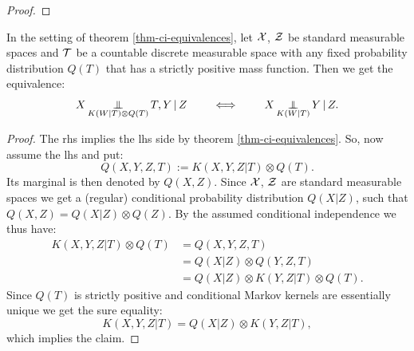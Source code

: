 \begin{Thm}
\begin{proof}

\end{proof}
\end{Thm}


\begin{Rem}
    In the setting of theorem \ref{thm-ci-equivalences},
    let  $\mathcal{X}$, $\mathcal{Z}$ be standard measurable spaces and $\mathcal{T}$ be a countable discrete measurable space with any fixed probability distribution $Q(T)$ that has a strictly positive mass function.
    Then we get the equivalence:
    \[X \operatorname*{\perp\mkern-11mu\perp}_{K(W|T)\otimes Q(T)} T,Y \operatorname*{|} Z  \qquad \iff \qquad  X \operatorname*{\perp\mkern-11mu\perp}_{K(W|T)} Y \operatorname*{|} Z.\]
    \begin{proof}
        The rhs implies the lhs side by theorem \ref{thm-ci-equivalences}. 
        So, now assume the lhs and put:
        \[ Q(X,Y,Z,T) := K(X,Y,Z|T) \otimes Q(T).  \]
        Its marginal is then denoted by $Q(X,Z)$.
        Since $\mathcal{X}$, $\mathcal{Z}$ are standard measurable spaces we get a (regular) conditional probability distribution $Q(X|Z)$, such that $Q(X,Z) = Q(X|Z)\otimes Q(Z)$. By the assumed conditional independence we thus have:
        \begin{align*}
            K(X,Y,Z|T) \otimes Q(T) &= Q(X,Y,Z,T) \\
                                    &= Q(X|Z) \otimes Q(Y,Z,T) \\
                                    &= Q(X|Z) \otimes K(Y,Z|T) \otimes Q(T).
        \end{align*}
        Since $Q(T)$ is strictly positive and conditional Markov kernels are essentially unique we get the sure equality:
        \[K(X,Y,Z|T) = Q(X|Z) \otimes K(Y,Z|T),\]
        which implies the claim.
    \end{proof}
\end{Rem}

